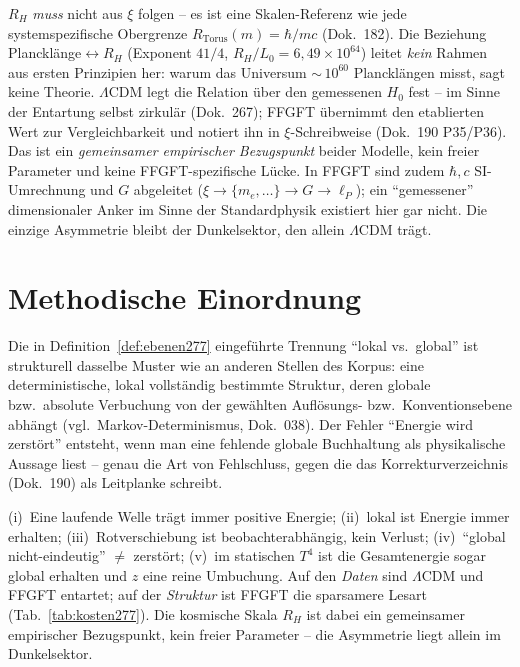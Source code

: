 \begin{remark}
$R_H$ \emph{muss} nicht aus $\xi$ folgen -- es ist eine Skalen-Referenz wie jede
systemspezifische Obergrenze $R_\text{Torus}(m)=\hbar/mc$ (Dok.~182). Die
Beziehung Plancklänge$\leftrightarrow R_H$ (Exponent $41/4$,
$R_H/L_0 = 6{,}49\times10^{64}$) leitet \emph{kein} Rahmen aus ersten Prinzipien
her: warum das Universum $\sim$\,$10^{60}$ Plancklängen misst, sagt keine
Theorie. $\Lambda$CDM legt die Relation über den gemessenen $H_0$ fest -- im
Sinne der Entartung selbst zirkulär (Dok.~267); FFGFT übernimmt den etablierten
Wert zur Vergleichbarkeit und notiert ihn in $\xi$-Schreibweise (Dok.~190
P35/P36). Das ist ein \emph{gemeinsamer empirischer Bezugspunkt} beider Modelle,
kein freier Parameter und keine FFGFT-spezifische Lücke. In FFGFT sind zudem
$\hbar, c$ SI-Umrechnung und $G$ abgeleitet ($\xi\to\{m_e,\ldots\}\to G\to
\ell_P$); ein \enquote{gemessener} dimensionaler Anker im Sinne der
Standardphysik existiert hier gar nicht. Die einzige Asymmetrie bleibt der
Dunkelsektor, den allein $\Lambda$CDM trägt.
\end{remark}

\section{Methodische Einordnung}

Die in Definition~\ref{def:ebenen277} eingeführte Trennung \enquote{lokal vs.\
global} ist strukturell dasselbe Muster wie an anderen Stellen des Korpus: eine
deterministische, lokal vollständig bestimmte Struktur, deren globale bzw.\
absolute Verbuchung von der gewählten Auflösungs- bzw.\ Konventionsebene abhängt
(vgl.\ Markov-Determinismus, Dok.~038). Der Fehler \enquote{Energie wird
zerstört} entsteht, wenn man eine fehlende globale Buchhaltung als
physikalische Aussage liest -- genau die Art von Fehlschluss, gegen die das
Korrekturverzeichnis (Dok.~190) als Leitplanke schreibt.

\begin{insight}
(i)~Eine laufende Welle trägt immer positive Energie; (ii)~lokal ist Energie
immer erhalten; (iii)~Rotverschiebung ist beobachterabhängig, kein Verlust;
(iv)~\enquote{global nicht-eindeutig} $\neq$ zerstört; (v)~im statischen $T^4$
ist die Gesamtenergie sogar global erhalten und $z$ eine reine Umbuchung. Auf
den \emph{Daten} sind $\Lambda$CDM und FFGFT entartet; auf der \emph{Struktur}
ist FFGFT die sparsamere Lesart (Tab.~\ref{tab:kosten277}). Die kosmische Skala
$R_H$ ist dabei ein gemeinsamer empirischer Bezugspunkt, kein freier Parameter
-- die Asymmetrie liegt allein im Dunkelsektor.
\end{insight}

